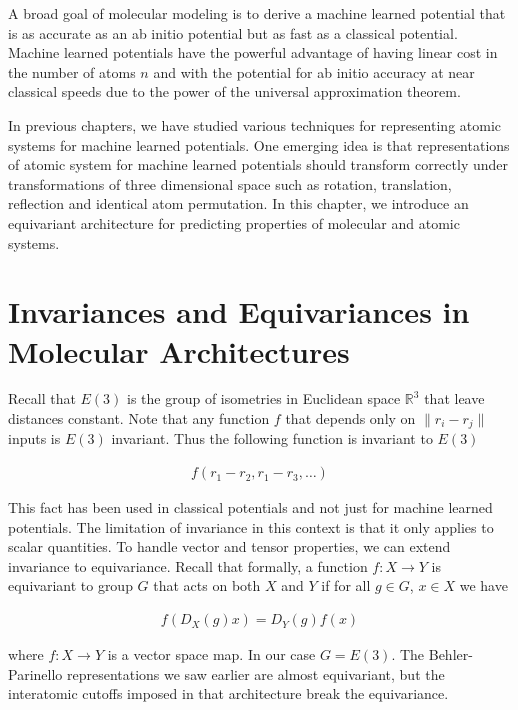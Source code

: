 \documentclass[book.tex]{subfiles}
\begin{document}
A broad goal of molecular modeling is to derive a machine learned potential that is as accurate as an ab initio potential but as fast as a classical potential. Machine learned potentials have the powerful advantage of having linear cost in the number of atoms $n$ and with the potential for ab initio accuracy at near classical speeds due to the power of the universal approximation theorem.

In previous chapters, we have studied various techniques for representing atomic systems for machine learned potentials. One emerging idea is that representations of atomic system for machine learned potentials should transform correctly under transformations of three dimensional space such as rotation, translation, reflection and identical atom permutation. In this chapter, we introduce an equivariant architecture for predicting properties of molecular and atomic systems.

\section{Invariances and Equivariances in Molecular Architectures}

Recall that $E(3)$ is the group of isometries in Euclidean space $\mathbb{R}^3$ that leave distances constant. Note that any function $f$ that depends only on $\|r_i - r_j\|$ inputs is $E(3)$ invariant. Thus the following function is invariant to $E(3)$

\begin{align}
    f(r_1-r_2, r_1-r_3,\dotsc)
\end{align}

This fact has been used in classical potentials and not just for machine learned potentials. The limitation of invariance in this context is that it only applies to scalar quantities. To handle vector and tensor properties, we can extend invariance to equivariance. Recall that formally, a function $f: X \to Y$ is equivariant to group $G$ that acts on both $X$ and $Y$ if for all $g \in G$, $x \in X$ we have

\begin{align}
f(D_X(g)x) = D_Y(g)f(x)  
\end{align}

where $f: X \to Y$ is a vector space map. In our case $G = E(3)$. The Behler-Parinello representations we saw earlier are almost equivariant, but the interatomic cutoffs imposed in that architecture break the equivariance. %
\end{document}
